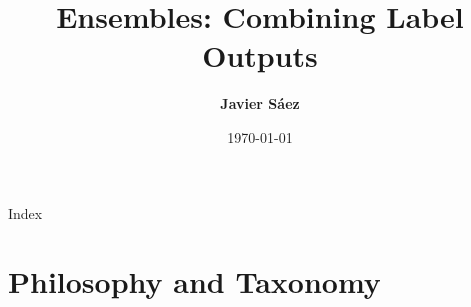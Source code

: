 \documentclass[xcolor=table]{beamer}
\begin{document}
\title[Ensembles: Combining Label Outputs ]{Ensembles: Combining Label Outputs }
\author[Javier Sáez]{\textbf {Javier Sáez}} %
\date{\today}

\begin{frame}
    \maketitle
\end{frame}

\begin{frame}{Index}
    \tableofcontents
\end{frame}

\section{Philosophy and Taxonomy}
\end{document}
